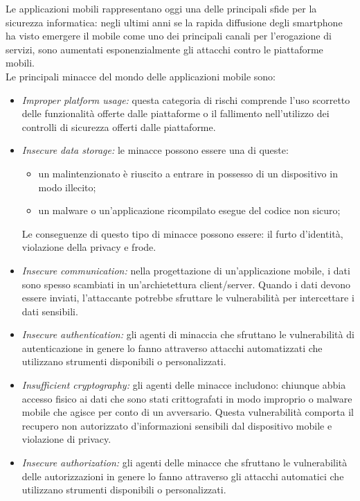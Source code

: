 Le applicazioni mobili rappresentano oggi una delle principali sfide per la sicurezza informatica: negli ultimi anni se la rapida diffusione degli smartphone ha visto emergere il mobile come uno dei principali canali per l'erogazione di servizi, sono aumentati esponenzialmente gli attacchi contro le piattaforme mobili.\\
Le principali minacce del mondo delle applicazioni mobile sono:
\begin{itemize}
    \item \textit{Improper platform usage:} questa categoria di rischi comprende l'uso scorretto delle funzionalità offerte dalle piattaforme o il fallimento nell'utilizzo dei controlli di sicurezza offerti dalle piattaforme.
    \item \textit{Insecure data storage:} le minacce possono essere una di queste:
    \begin{itemize}
        \item un malintenzionato è riuscito a entrare in possesso di un dispositivo in modo illecito;
        \item un malware o un'applicazione ricompilato esegue del codice non sicuro;
    \end{itemize}
    Le conseguenze di questo tipo di minacce possono essere: il furto d'identità, violazione della privacy e frode.
    \item \textit{Insecure communication:}
    nella progettazione di un'applicazione mobile, i dati sono spesso scambiati in un'archietettura client/server.
    Quando i dati devono essere inviati, l'attaccante potrebbe sfruttare le vulnerabilità per intercettare i dati sensibili.
    \item \textit{Insecure authentication:}
    gli agenti di minaccia che sfruttano le vulnerabilità di autenticazione in genere lo fanno attraverso attacchi automatizzati che utilizzano strumenti disponibili o personalizzati.
    \item \textit{Insufficient cryptography:} gli agenti delle minacce includono: chiunque abbia accesso fisico ai dati che sono stati crittografati in modo improprio o malware mobile che agisce per conto di un avversario.
    Questa vulnerabilità comporta il recupero non autorizzato d'informazioni sensibili dal dispositivo mobile e violazione di privacy.
    \item \textit{Insecure authorization:}
    gli agenti delle minacce che sfruttano le vulnerabilità delle autorizzazioni in genere lo fanno attraverso gli attacchi automatici che utilizzano strumenti disponibili o personalizzati.

\end{itemize}
